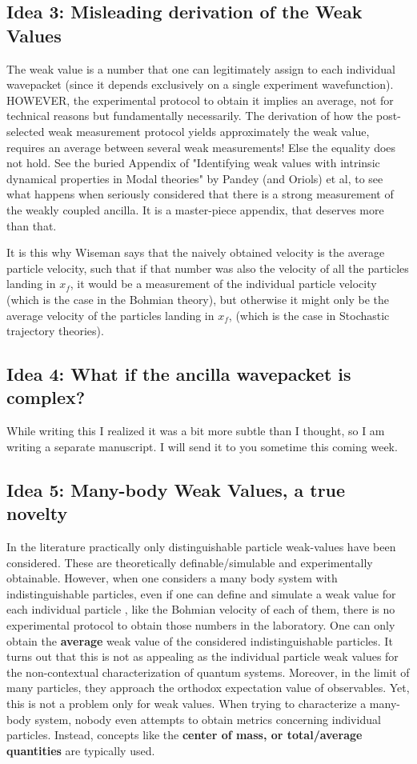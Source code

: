 \documentclass[11pt, a4paper]{article} %
\begin{document}
\subsection*{Idea 3: Misleading derivation of the Weak Values}
The weak value is a number that one can legitimately assign to each individual wavepacket (since it depends exclusively on a single experiment wavefunction). HOWEVER, the experimental protocol to obtain it implies an average, not for technical reasons but fundamentally necessarily. The derivation of how the post-selected weak measurement protocol yields approximately the weak value, requires an average between several weak measurements! Else the equality does not hold. See the buried Appendix of "Identifying weak values with intrinsic dynamical properties in Modal theories" by Pandey (and Oriols) et al, to see what happens when seriously considered that there is a strong measurement of the weakly coupled ancilla. It is a master-piece appendix, that deserves more than that. 

It is this why Wiseman says that the naively obtained velocity is the average particle velocity, such that if that number was also the velocity of all the particles landing in $x_f$, it would be a measurement of the individual particle velocity (which is the case in the Bohmian theory), but otherwise it might only be the average velocity of the particles landing in $x_f$, (which is the case in Stochastic trajectory theories).


\subsection*{Idea 4: What if the ancilla wavepacket is complex?}
While writing this I realized it was a bit more subtle than I thought, so I am writing a separate manuscript. I will send it to you sometime this coming week.

\subsection*{Idea 5: Many-body Weak Values, a true novelty}
In the literature practically only distinguishable particle weak-values have been considered. These are theoretically definable/simulable and experimentally obtainable. However, when one considers a many body system with indistinguishable particles, even if one can define and simulate a weak value for each individual particle , like the Bohmian velocity of each of them, there is no experimental protocol to obtain those numbers in the laboratory. One can only obtain the {\bf average} weak value of the considered indistinguishable particles. It turns out that this is not as appealing as the individual particle weak values for the non-contextual characterization of quantum systems. Moreover, in the limit of many particles, they approach the orthodox expectation value of observables. Yet, this is not a problem only for weak values. When trying to characterize a many-body system, nobody even attempts to obtain metrics concerning individual particles. Instead, concepts like the {\bf center of mass, or total/average quantities} are typically used. 
\end{document}
